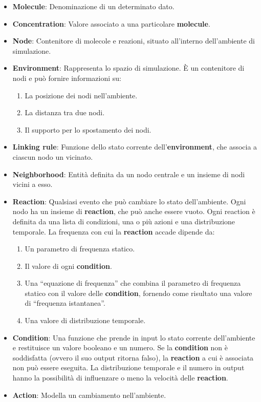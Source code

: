\begin{itemize}
	\item \textbf{Molecule}:  Denominazione di un determinato dato.
	\item \textbf{Concentration}:  Valore associato a una particolare \textbf{molecule}. 
	\item \textbf{Node}: Contenitore di molecole e reazioni, situato all'interno dell'ambiente di simulazione.
	\item \textbf{Environment}: Rappresenta lo spazio di simulazione. È un contenitore di nodi e può fornire informazioni su:
	\begin{enumerate}
		\item La posizione dei nodi nell'ambiente.
		\item La distanza tra due nodi.
		\item Il supporto per lo spostamento dei nodi.
	\end{enumerate}
	\item \textbf{Linking rule}: Funzione dello stato corrente dell'\textbf{environment}, che associa a ciascun nodo un vicinato.
	\item \textbf{Neighborhood}: Entità definita da un nodo centrale e un insieme di nodi vicini a esso.
	\item \textbf{Reaction}: Qualsiasi evento che può cambiare lo stato dell'ambiente. Ogni nodo ha un insieme di \textbf{reaction}, che può anche essere vuoto. Ogni reaction è definita da una lista di condizioni, una o più azioni e una distribuzione temporale. La frequenza con cui la \textbf{reaction} accade dipende da:
		\begin{enumerate}
		\item Un parametro di frequenza statico.
		\item Il valore di ogni \textbf{condition}.
		\item Una ``equazione di frequenza'' che combina il parametro di frequenza statico con il valore delle \textbf{condition}, fornendo come risultato una valore di ``frequenza istantanea''.
		\item Una valore di distribuzione temporale.
	\end{enumerate}
	\item \textbf{Condition}: Una funzione che prende in input lo stato corrente dell'ambiente e restituisce un valore booleano e un numero. Se la \textbf{condition} non è soddisfatta (ovvero il suo output ritorna falso), la \textbf{reaction} a cui è associata non può essere eseguita. La distribuzione temporale e il numero in output hanno la possibilità di influenzare o meno la velocità delle \textbf{reaction}.
	\item \textbf{Action}: Modella un cambiamento nell'ambiente.
\end{itemize}

